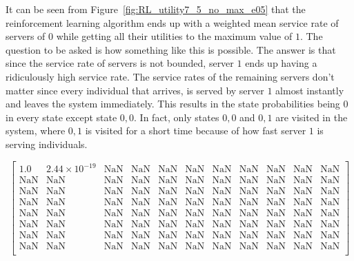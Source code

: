 It can be seen from Figure~\ref{fig:RL_utility7_5_no_max_e05} that the
reinforcement learning algorithm ends up with a weighted mean service rate of
servers of \(0\) while getting all their utilities to the maximum value of
\(1\).
The question to be asked is how something like this is possible.
The answer is that since the service rate of servers is not bounded, server
\(1\) ends up having a ridiculously high service rate.
The service rates of the remaining servers don't matter since every individual
that arrives, is served by server \(1\) almost instantly and leaves the system
immediately.
This results in the state probabilities being \(0\) in every state except state
\(0,0\).
In fact, only states \(0,0\) and \(0,1\) are visited in the system, where
\(0,1\) is visited for a short time because of how fast server \(1\) is
serving individuals.


\scriptsize
\begin{equation}\label{eq:no_upper_bound_states_example}
\begin{bmatrix}
    1.0 & 2.44\times10^{-19} & \text{NaN} & \text{NaN} & \text{NaN} & \text{NaN}
    & \text{NaN} & \text{NaN} & \text{NaN} & \text{NaN} & \text{NaN} \\
    \text{NaN} & \text{NaN} & \text{NaN} & \text{NaN} & \text{NaN} & \text{NaN}
    & \text{NaN} & \text{NaN} & \text{NaN} & \text{NaN} & \text{NaN} \\
    \text{NaN} & \text{NaN} & \text{NaN} & \text{NaN} & \text{NaN} & \text{NaN}
    & \text{NaN} & \text{NaN} & \text{NaN} & \text{NaN} & \text{NaN} \\
    \text{NaN} & \text{NaN} & \text{NaN} & \text{NaN} & \text{NaN} & \text{NaN}
    & \text{NaN} & \text{NaN} & \text{NaN} & \text{NaN} & \text{NaN} \\
    \text{NaN} & \text{NaN} & \text{NaN} & \text{NaN} & \text{NaN} & \text{NaN}
    & \text{NaN} & \text{NaN} & \text{NaN} & \text{NaN} & \text{NaN} \\
    \text{NaN} & \text{NaN} & \text{NaN} & \text{NaN} & \text{NaN} & \text{NaN}
    & \text{NaN} & \text{NaN} & \text{NaN} & \text{NaN} & \text{NaN} \\
    \text{NaN} & \text{NaN} & \text{NaN} & \text{NaN} & \text{NaN} & \text{NaN}
    & \text{NaN} & \text{NaN} & \text{NaN} & \text{NaN} & \text{NaN} \\
    \text{NaN} & \text{NaN} & \text{NaN} & \text{NaN} & \text{NaN} & \text{NaN}
    & \text{NaN} & \text{NaN} & \text{NaN} & \text{NaN} & \text{NaN} \\
\end{bmatrix}
\end{equation}

